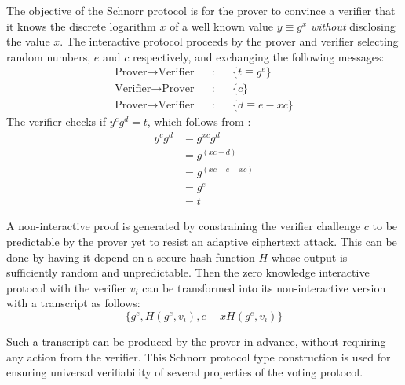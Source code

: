 The objective of the Schnorr protocol is for the prover to convince a
verifier that it knows the discrete logarithm $x$ of a well known
value $y \equiv g^x$ \emph{without} disclosing the value $x$.  The interactive
protocol proceeds by the prover and verifier selecting random numbers,
$e$ and $c$ respectively,
and exchanging the following messages:
\[
\begin{array}{lcccc} 
  \text{Prover} \rightarrow \text{Verifier} & & : & & \{ t \equiv g^e  \} \\
  \text{Verifier} \rightarrow \text{Prover} & & : & & \{ c \} \\
  \text{Prover} \rightarrow \text{Verifier} & & : & & \{ d \equiv e - xc \} 
\end{array}
\]
The verifier checks if $y^cg^d = t$, which follows from :
\begin{equation} \label{eq2}
\begin{split}
y^cg^d & = g^{xc}g^d \\
       & = g^{(xc + d)}  \\
       & = g^{(xc + e - xc)} \\
       & = g^e \\
       & = t 
\end{split}
\end{equation}

A non-interactive proof is generated by constraining the verifier challenge
$c$ to be predictable by the prover yet to resist an adaptive
ciphertext attack.
This can be done by having it depend on a secure hash function $H$ whose
output is sufficiently random and unpredictable.  Then the zero
knowledge interactive protocol with the verifier $v_i$
can be transformed into its non-interactive version with a
transcript as follows:
\[
\{ g^e , H(g^e, v_i) , e - xH(g^e, v_i) \} 
\]

Such a transcript can be produced by the prover in advance, without
requiring any action from the verifier.  This Schnorr protocol type
construction is used for ensuring universal verifiability of several
properties of the voting protocol.
